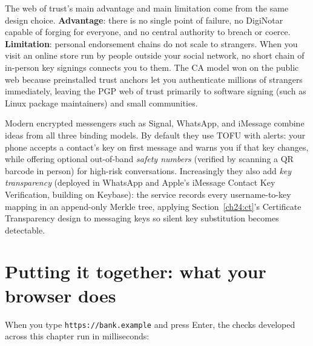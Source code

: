 \begin{whybox}
The web of trust's main advantage and main limitation come from the same design choice. \textbf{Advantage}: there is no single point of failure, no DigiNotar capable of forging for everyone, and no central authority to breach or coerce. \textbf{Limitation}: personal endorsement chains do not scale to strangers. When you visit an online store run by people outside your social network, no short chain of in-person key signings connects you to them. The CA model won on the public web because preinstalled trust anchors let you authenticate millions of strangers immediately, leaving the PGP web of trust primarily to software signing (such as Linux package maintainers) and small communities.
\end{whybox}

\begin{applicationbox}
Modern encrypted messengers such as Signal, WhatsApp, and iMessage combine ideas from all three binding models. By default they use TOFU with alerts: your phone accepts a contact's key on first message and warns you if that key changes, while offering optional out-of-band \emph{safety numbers} (verified by scanning a QR barcode in person) for high-risk conversations. Increasingly they also add \emph{key transparency} (deployed in WhatsApp and Apple's iMessage Contact Key Verification, building on Keybase): the service records every username-to-key mapping in an append-only Merkle tree, applying Section~\ref{ch24:ct}'s Certificate Transparency design to messaging keys so silent key substitution becomes detectable.
\end{applicationbox}

\section{Putting it together: what your browser does}
\label{ch24:together}

When you type \texttt{https://bank.example} and press Enter, the checks developed across this chapter run in milliseconds:


